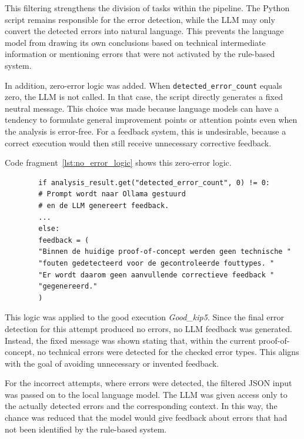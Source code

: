 This filtering strengthens the division of tasks within the pipeline. The Python script remains responsible for the error detection, while the LLM may only convert the detected errors into natural language. This prevents the language model from drawing its own conclusions based on technical intermediate information or mentioning errors that were not activated by the rule-based system.

In addition, zero-error logic was added. When \texttt{detected\_error\_count} equals zero, the LLM is not called. In that case, the script directly generates a fixed neutral message. This choice was made because language models can have a tendency to formulate general improvement points or attention points even when the analysis is error-free. For a feedback system, this is undesirable, because a correct execution would then still receive unnecessary corrective feedback.

Code fragment~\ref{lst:no_error_logic} shows this zero-error logic.

\begin{listing}[H]
    \begin{verbatim}
        if analysis_result.get("detected_error_count", 0) != 0:
        # Prompt wordt naar Ollama gestuurd
        # en de LLM genereert feedback.
        ...
        else:
        feedback = (
        "Binnen de huidige proof-of-concept werden geen technische "
        "fouten gedetecteerd voor de gecontroleerde fouttypes. "
        "Er wordt daarom geen aanvullende correctieve feedback "
        "gegenereerd."
        )
    \end{verbatim}
    \caption{Zero-error logic in which the LLM is not called when no errors are detected, from \href{https://github.com/Tristanvanspeybroeck/bachelorproef-Methodologie-25-26-Van-Speybroeck-Tristan/blob/main/Methodologie/pose_project/src/generate_feedback.py}{\texttt{generate\_feedback.py}}}
    \label{lst:no_error_logic}
\end{listing}

This logic was applied to the good execution \textit{Good\_kip5}. Since the final error detection for this attempt produced no errors, no LLM feedback was generated. Instead, the fixed message was shown stating that, within the current proof-of-concept, no technical errors were detected for the checked error types. This aligns with the goal of avoiding unnecessary or invented feedback.

For the incorrect attempts, where errors were detected, the filtered JSON input was passed on to the local language model. The LLM was given access only to the actually detected errors and the corresponding context. In this way, the chance was reduced that the model would give feedback about errors that had not been identified by the rule-based system.

